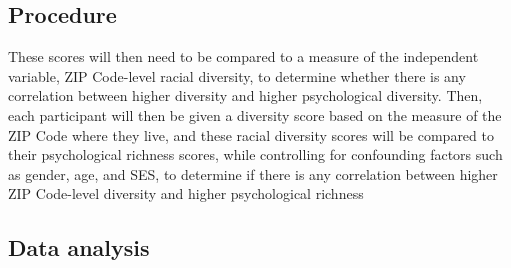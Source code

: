 \documentclass[
  man,floatsintext]{apa7}
\begin{document}
\hypertarget{procedure}{%
\subsection{Procedure}\label{procedure}}

These scores will then need to be compared to a measure of the independent variable, ZIP Code-level racial diversity, to determine whether there is any correlation between higher diversity and higher psychological diversity. Then, each participant will then be given a diversity score based on the measure of the ZIP Code where they live, and these racial diversity scores will be compared to their psychological richness scores, while controlling for confounding factors such as gender, age, and SES, to determine if there is any correlation between higher ZIP Code-level diversity and higher psychological richness

\hypertarget{data-analysis}{%
\subsection{Data analysis}\label{data-analysis}}
\end{document}
